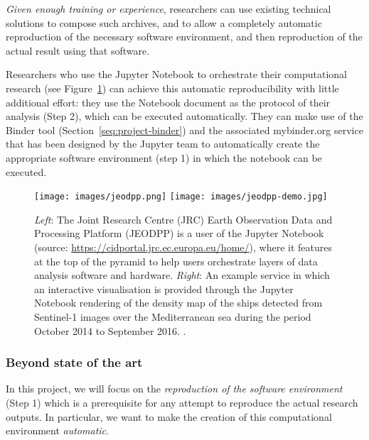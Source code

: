 \emph{Given enough training or experience}, researchers can use existing technical
solutions to compose such archives, and to allow a completely automatic
reproduction of the necessary software environment, and then reproduction of the actual
result using that software.

\medskip Researchers who use the Jupyter Notebook to orchestrate their
computational research (see Figure~\ref{fig:jeodpp}) can achieve this automatic
reproducibility with little additional effort: they use the Notebook document as
the protocol of their analysis (Step 2), which can be executed automatically.
They can make use of the Binder tool (Section~\ref{seq:project-binder}) and the
associated mybinder.org service that has
been designed by the Jupyter team to automatically create the appropriate
software environment (step 1) in which the notebook can be executed.

\begin{figure}[tb]
  \centering\texttt{[image: images/jeodpp.png]}
  \centering\texttt{[image: images/jeodpp-demo.jpg]}
  \caption{\emph{Left}: The Joint Research Centre (JRC) Earth Observation
    Data and Processing Platform (JEODPP) is a user of the
    Jupyter Notebook (source:
    \url{https://cidportal.jrc.ec.europa.eu/home/}), where it features
    at the top of the pyramid to help users orchestrate layers of data
    analysis software and hardware. \emph{Right}: An example
    service in which an interactive visualisation is provided through
    the Jupyter Notebook rendering of the density map of the ships
    detected from Sentinel-1 images over the Mediterranean sea during
    the period October 2014 to September 2016. \cite[Figure
    6]{Soille2018}. \label{fig:jeodpp}}
\end{figure}

\subsubsection{Beyond state of the art}

In this project, we will focus on the \emph{reproduction of the
  software environment} (Step 1) which is a prerequisite for any attempt to
reproduce the actual research outputs. In particular, we want to make the
creation of this computational environment \emph{automatic}.

